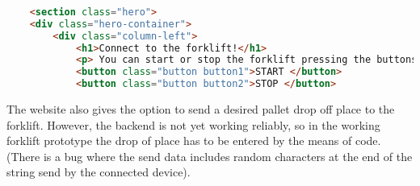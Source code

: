 \documentclass[../report.tex]{subfiles}
\begin{document}
\begin{lstlisting}[language=html,caption={The buttons' Code},label={code:webpage}]
    
    <section class="hero">
    <div class="hero-container">
        <div class="column-left">
            <h1>Connect to the forklift!</h1>
            <p> You can start or stop the forklift pressing the buttons:</p>
            <button class="button button1">START </button>
            <button class="button button2">STOP </button>   

\end{lstlisting}
The website also gives the option to send a desired pallet drop off place to the forklift. However,
the backend is not yet working reliably, so in the working forklift prototype the drop of place has to be
entered by the means of code. (There is a bug where the send data includes random characters at the end of the string
send by the connected device).
\end{document}
